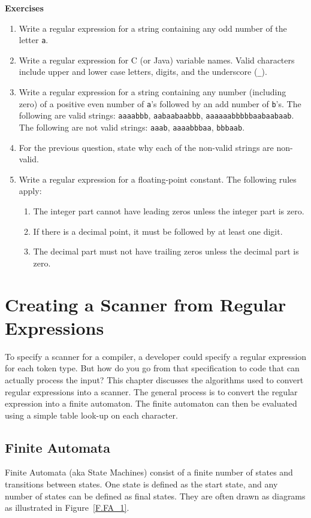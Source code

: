 \documentclass[letterpaper,12pt,openany,reqno]{book}%
\begin{document}
\textbf{Exercises}

\begin{enumerate}
\item Write a regular expression for a string containing any odd number of the letter \texttt{a}.
\item Write a regular expression for C (or Java) variable names. Valid characters include upper and lower case letters, digits, and the underscore (\texttt{\_}).
\item Write a regular expression for a string containing any number (including zero) of a positive even number of \texttt{a}'s followed by an add number of \texttt{b}'s. The following are valid strings: \texttt{aaaabbb}, \texttt{aabaabaabbb}, \texttt{aaaaaabbbbbaabaabaab}. The following are not valid strings: \texttt{aaab}, \texttt{aaaabbbaa}, \texttt{bbbaab}.
\item For the previous question, state why each of the non-valid strings are non-valid.
\item Write a regular expression for a floating-point constant. The following rules apply: 
\begin{enumerate}
\item The integer part cannot have leading zeros unless the integer part is zero. 
\item If there is a decimal point, it must be followed by at least one digit.
\item The decimal part must not have trailing zeros unless the decimal part is zero.
\end{enumerate}
\end{enumerate}

\chapter[Creating a Scanner]{Creating a Scanner from Regular Expressions}

To specify a scanner for a compiler, a developer could specify a regular expression for each token type. But how do you go from that specification to code that can actually process the input? This chapter discusses the algorithms used to convert regular expressions into a scanner. The general process is to convert the regular expression into a finite automaton. The finite automaton can then be evaluated using a simple table look-up on each character.

\section{Finite Automata}
Finite Automata (aka State Machines) consist of a finite number of states and transitions between states. One state is defined as the start state, and any number of states can be defined as final states. They are often drawn as diagrams as illustrated in Figure~\ref{F.FA_1}.
\end{document}
